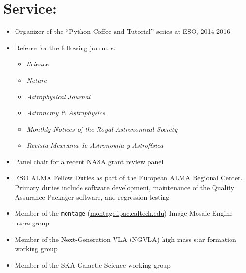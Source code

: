 
\section*{Service:}
\vspace{-10pt}
\begin{itemize}
\itemsep-3pt
        
    \item Organizer of the ``Python Coffee and Tutorial'' series at ESO, 2014-2016
    \item Referee for the following journals:
        \begin{itemize}
            \itemsep-3pt
            \item \textit{Science}
            \item \textit{Nature}
            \item \textit{Astrophysical Journal}
            \item \textit{Astronomy \& Astrophysics}
            \item \textit{Monthly Notices of the Royal Astronomical Society}
            \item \textit{Revista Mexicana de Astronom{\'i}a y Astrof{\'i}sica}
    \end{itemize}
    \item Panel chair for a recent NASA grant review panel
    \item ESO ALMA Fellow Duties as part of the European ALMA Regional Center.
        Primary duties include software development, maintenance of the
        Quality Assurance Packager software, and regression testing
    \item Member of the \texttt{montage} (\url{montage.ipac.caltech.edu}) Image
        Mosaic Engine users group
    \item Member of the Next-Generation VLA (NGVLA) high mass star formation
        working group
    \item Member of the SKA Galactic Science
        working group
\end{itemize}
